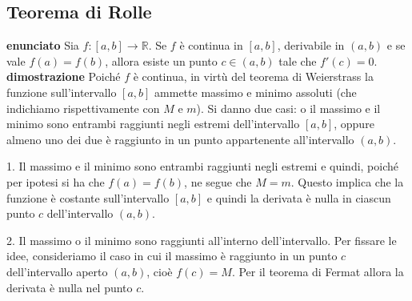 \documentclass[a4paper, 9pt]{report}
\begin{document}
\newpage
\subsection*{Teorema di Rolle}
\textbf{enunciato}\newline
Sia $f:[a,b] \rightarrow  \mathbb{R}$. Se $f$ è continua in $[a,b]$, derivabile in $(a,b)$ e se vale $f(a) = f(b)$, allora esiste un punto $c \in(a,b)$ tale che $f'(c) = 0$.\newline
\newline
\textbf{dimostrazione}\newline
Poiché $f$ è continua, in virtù del teorema di Weierstrass la funzione sull'intervallo $[a,b]$ ammette massimo e minimo assoluti (che indichiamo rispettivamente con $M$ e $m$). Si danno due casi: o il massimo e il minimo sono entrambi raggiunti negli estremi dell'intervallo $[a,b]$, oppure almeno uno dei due è raggiunto in un punto appartenente all'intervallo $(a,b)$.\newline

1. Il massimo e il minimo sono entrambi raggiunti negli estremi e quindi, poiché per ipotesi si ha che $f(a)=f(b)$, ne segue che $M=m$. Questo implica che la funzione è costante sull'intervallo $[a,b]$ e quindi la derivata è nulla in ciascun punto $c$ dell'intervallo $(a,b)$.


2. Il massimo o il minimo sono raggiunti all'interno dell'intervallo. Per fissare le idee, consideriamo il caso in cui il massimo è raggiunto in un punto $c$ dell'intervallo aperto $(a,b)$, cioè $f(c)=M$. Per il teorema di Fermat allora la derivata è nulla nel punto $c$.






\newpage
\end{document}
